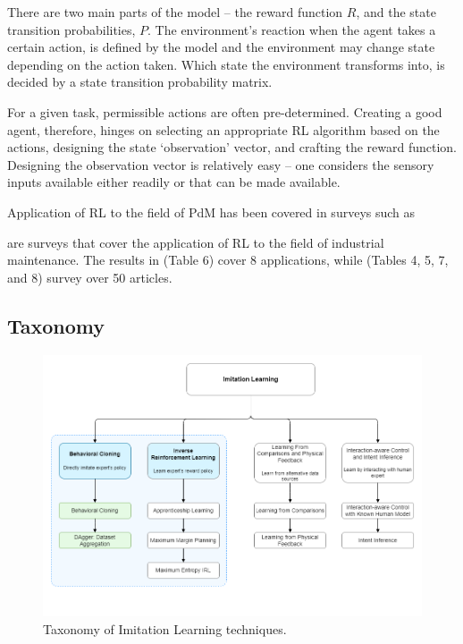\documentclass{article}
\begin{document}
There are two main parts of the model -- the reward function $R$, and the state transition probabilities, $P$. The environment's reaction when the agent takes a certain action, is defined by the model and the environment may change state depending on the action taken. Which state the environment transforms into, is decided by a state transition probability matrix. 

For a given task, permissible actions are often pre-determined. Creating a good agent, therefore, hinges on selecting an appropriate RL algorithm based on the actions, designing the state `observation' vector, and crafting the reward function. Designing the observation vector is relatively easy -- one considers the sensory inputs available either readily or that can be made available. 

Application of RL to the field of PdM has been covered in surveys such as \cite{Erhan2021Smart, Ren2021, Barja-Martinez2021, panzer2022, siraskar2023}

\cite{panzer2022, siraskar2023} are surveys that cover the application of RL to the field of industrial maintenance. The results in \cite{panzer2022} (Table 6) cover 8 applications, while \cite{siraskar2023} (Tables 4, 5, 7, and 8) survey over 50 articles. 

\subsection{Taxonomy}

\begin{figure}[h]
	\centering
	\includegraphics[width=\linewidth]{images/IRL_Taxonomy.png}
	\caption{Taxonomy of Imitation Learning techniques.}
	\label{fig:taxonomy}
\end{figure}
\end{document}
